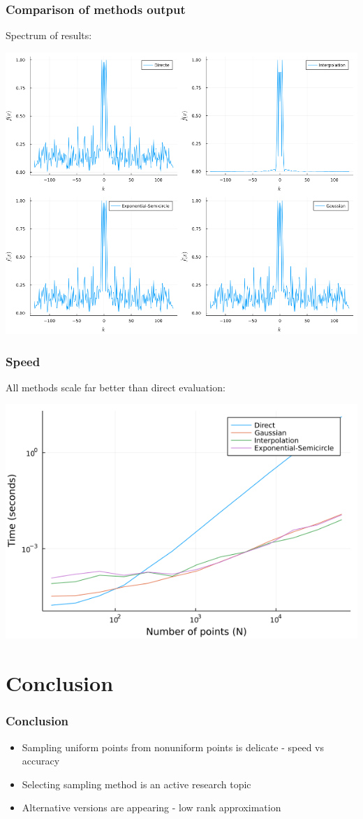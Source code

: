 \documentclass{beamer}
\begin{document}
\begin{frame}
  \frametitle{Comparison of methods output}
  Spectrum of results:

  \vfill

  \centering \includegraphics[width=.8\textwidth]{images/spectrum.png}

\end{frame}

\begin{frame}
  \frametitle{Speed}
  All methods scale far better than direct evaluation:

  \vfill

  \centering \includegraphics[width=.8\textwidth]{images/n_vs_time.png}

\end{frame}

\section{Conclusion}
\begin{frame}
  \frametitle{Conclusion}

  \begin{itemize}
      \item Sampling uniform points from nonuniform points is delicate - speed vs accuracy
      \item Selecting sampling method is an active research topic
      \item Alternative versions are appearing - low rank approximation
  \end{itemize}


\end{frame}
\end{document}
